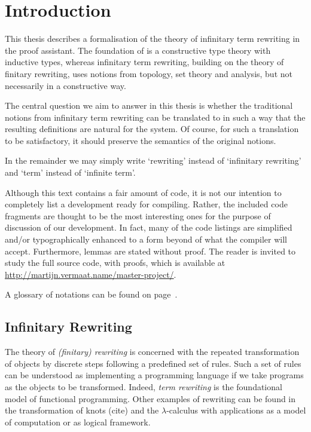 \chapter{Introduction}
\setcounter{page}{1}

This thesis describes a formalisation of the theory of infinitary term
rewriting in the \Coq proof assistant. The foundation of \Coq is a
constructive type theory with inductive types, whereas infinitary term
rewriting, building on the theory of finitary rewriting, uses notions
from topology, set theory and analysis, but not necessarily in a
constructive way.

The central question we aim to answer in this thesis is whether the
traditional notions from infinitary term rewriting can be translated
to \Coq in such a way that the resulting definitions are natural for
the \Coq system. Of course, for such a translation to be satisfactory,
it should preserve the semantics of the original notions.


In the remainder we may simply write `rewriting' instead of
`infinitary rewriting' and `term' instead of `infinite
term'.

Although this text contains a fair amount of \Coq code, it is not our
intention to completely list a development ready for compiling. Rather, the
included code fragments are thought to be the most interesting ones for the
purpose of discussion of our development. In fact, many of the code listings
are simplified and/or typographically enhanced to a form beyond of what the
\Coq compiler will accept. Furthermore, lemmas are stated without proof. The
reader is invited to study the full source code, with proofs, which is
available at \url{http://martijn.vermaat.name/master-project/}.

A glossary of notations can be found on page~\pageref{chap:glossary}.


\section*{Infinitary Rewriting}

The theory of \emph{(finitary) rewriting} is concerned with the
repeated transformation of objects by discrete steps following a
predefined set of rules. Such a set of rules can be understood as
implementing a programming language if we take programs as the objects
to be transformed. Indeed, \emph{term rewriting} is the foundational
model of functional programming. Other examples of rewriting can be
found in the transformation of knots (cite) and the $\lambda$-calculus
with applications as a model of computation or as logical framework.

